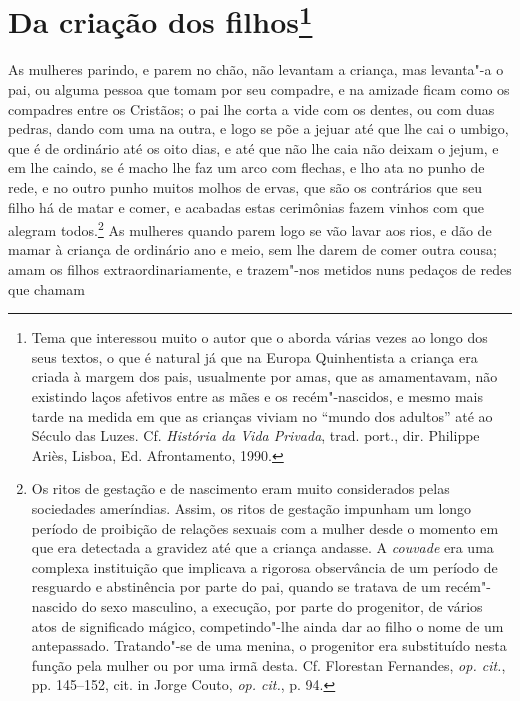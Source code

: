 \section[Da criação dos filhos]{Da criação dos filhos\protect\footnote[*]{ \MakeUppercase{T}ema que interessou muito o
autor que o aborda várias vezes ao longo dos seus textos, o que é
natural já que na \MakeUppercase{E}uropa \MakeUppercase{Q}uinhentista a criança era criada à margem dos
pais, usualmente por amas, que as amamentavam, não existindo laços
afetivos entre as mães e os recém"-nascidos, e mesmo mais tarde na
medida em que as crianças viviam no ``mundo dos adultos'' até ao \MakeUppercase{S}éculo
das \MakeUppercase{L}uzes. \MakeUppercase{C}f. \textit{\MakeUppercase{H}istória da \MakeUppercase{V}ida \MakeUppercase{P}rivada}, trad. port., dir.
\MakeUppercase{P}hilippe \MakeUppercase{A}riès, \MakeUppercase{L}isboa, \MakeUppercase{E}d. \MakeUppercase{A}frontamento, 1990.}} 
 As mulheres parindo, e parem no chão, não levantam a criança, mas
levanta"-a o pai, ou alguma pessoa que tomam por seu compadre, e na
amizade ficam como os compadres entre os Cristãos; o pai lhe corta a
vide com os dentes, ou com duas pedras, dando com uma na outra, e logo
se põe a jejuar até que lhe cai o umbigo, que é de ordinário até os
oito dias, e até que não lhe caia não deixam o jejum, e em lhe caindo,
se é macho lhe faz um arco com flechas, e lho ata no punho de rede, e
no outro punho muitos molhos de ervas, que são os contrários que seu
filho há de matar e comer, e acabadas estas cerimônias fazem vinhos com
que alegram todos.\footnote{ Os ritos de gestação e de nascimento eram
muito considerados pelas sociedades ameríndias. Assim, os ritos de
gestação impunham um longo período de proibição de relações sexuais com
a mulher desde o momento em que era detectada a gravidez até que a
criança andasse. A \textit{couvade} era uma complexa instituição que
implicava a rigorosa observância de um período de resguardo e
abstinência por parte do pai, quando se tratava de um recém"-nascido do
sexo masculino, a execução, por parte do progenitor, de vários atos de
significado mágico, competindo"-lhe ainda dar ao filho o nome de um
antepassado. Tratando"-se de uma menina, o progenitor era substituído
nesta função pela mulher ou por uma irmã desta. Cf. Florestan
Fernandes, \textit{op. cit.}, pp. 145--152, cit. in Jorge Couto, 
\textit{op. cit.}, p. 94.} As mulheres quando parem logo se vão lavar
aos rios, e dão de mamar à criança de ordinário ano e meio, sem lhe
darem de comer outra cousa; amam os filhos extraordinariamente, e
trazem"-nos metidos nuns pedaços de redes que chamam 
